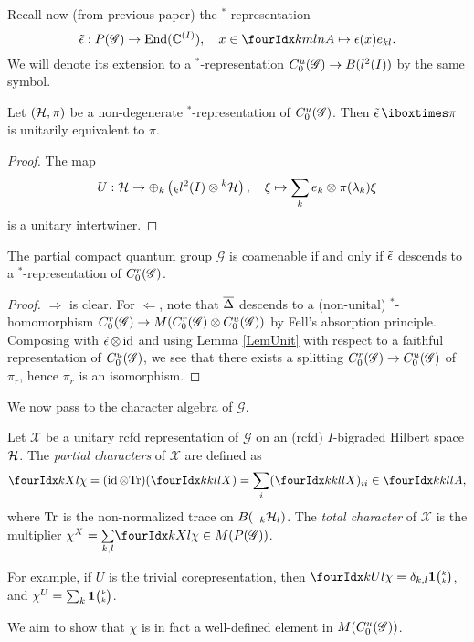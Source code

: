 Recall now (from previous paper) the $^*$-representation \[\weps: P(\mathscr{G}) \rightarrow \End(\C^{(I)}), \quad x\in \Gr{A}{k}{l}{m}{n}\mapsto \epsilon(x) e_{kl}.\] We will denote its extension to a $^*$-representation $C^{u}_{0}(\mathscr{G})\rightarrow B(l^2(I))$ by the same symbol.

\begin{Lem}\label{LemUnit} Let $(\mathcal{H},\pi)$ be a non-degenerate $^*$-representation of $C^{u}_{0}(\mathscr{G})$. Then $\weps\iboxtimes \pi$ is unitarily equivalent to $\pi$.
\end{Lem} 
\begin{proof} The map \[U: \mathcal{H} \rightarrow \oplus_k \left({}_kl^2(I)\otimes {}^k\mathcal{H}\right),\quad \xi \mapsto \sum_k e_k\otimes \pi(\lambda_k)\xi\] is a unitary intertwiner.
\end{proof} 

\begin{Cor} The partial compact quantum group $\mathscr{G}$ is coamenable if and only if $\operatorname{\tilde{\epsilon}}$ descends to a $^*$-representation of $C^{r}_{0}(\mathscr{G})$.
\end{Cor} 
\begin{proof} $\Rightarrow$ is clear. For $\Leftarrow$, note that $\overline{\Delta}$ descends to a (non-unital) $^*$-homomorphism $C^{r}_{0}(\mathscr{G})\rightarrow M(C^{r}_{0}(\mathscr{G})\otimes C^{u}_{0}(\mathscr{G}))$ by Fell's absorption principle. Composing with $\operatorname{\tilde{\epsilon}}\otimes \operatorname{id}$ and using Lemma \ref{LemUnit} with respect to a faithful representation of $C^{u}_{0}(\mathscr{G})$, we see that there exists a splitting $C^{r}_{0}(\mathscr{G})\rightarrow C^{u}_{0}(\mathscr{G})$ of $\pi_r$, hence $\pi_r$ is an isomorphism.
\end{proof}
 
 We now pass to the character algebra of $\mathscr{G}$.
 
 \begin{Def} Let $\mathscr{X}$ be a unitary rcfd representation of $\mathscr{G}$ on an (rcfd) $I$-bigraded Hilbert space $\mathcal{H}$. The \emph{partial characters} of $\mathscr{X}$ are defined as \[\Gr{\chi}{}{X}{k}{l} = (\id\otimes \Tr)(\Gr{X}{k}{l}{k}{l}) = \sum_i(\Gr{X}{k}{l}{k}{l})_{ii} \in \Gr{A}{k}{l}{k}{l},\] where $\mathrm{Tr}$ is the non-normalized trace on $B(\;{}_{\;k}\mathcal{H}_{l})$. The \emph{total character} of $\mathscr{X}$ is the multiplier $\chi^X  =\underset{k,l}{\sum} \Gr{\chi}{}{X}{k}{l}\in M(P(\mathscr{G}))$.
 \end{Def}
 
 For example, if $U$ is the trivial corepresentation, then $\Gr{\chi}{}{U}{k}{l} = \delta_{k,l}\UnitC{k}{k}$, and $\chi^U = \sum_k \mathbf{1}{\tiny {\begin{pmatrix} k\\k\end{pmatrix}}}$.
 
 We aim to show that $\chi$ is in fact a well-defined element in $M(C^{u}_{0}(\mathscr{G}))$. 
 

